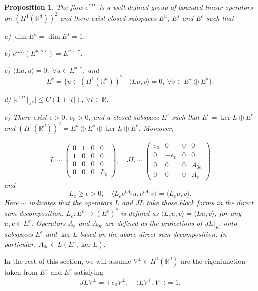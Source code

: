 \documentclass[12pt]{amsart}
\newcommand{\R}{\mathbb R}
\newtheorem{proposition}[theorem]{Proposition}
\begin{document}
\begin{proposition}\label{prop:linzeng}
The flow $e^{tJL}$ is a well-defined group of bounded linear operators on $(H^1(\R^d))^2$ and there exist closed subspaces $E^u,\ E^s$ and $E^c$ such that 

a) 
$\dim E^u=\dim E^s=1$.

b) $e^{tJL}(E^{u,s,c})=E^{u,s,c}$.

c) $ \langle Lu, u\rangle =0, \; \forall u\in E^{u,s},$ and $$E^c=\{u\in (H^1(\R^d))^2 \mid \langle Lu, v\rangle=0, \ \forall v\in E^u\oplus E^s\}.$$


d) $\bigl |e^{tJL}|_{E^c}\big|\le C(1+|t|)$, $\forall t\in \mathbb R $.

e) There exist $\epsilon >0$, $e_0>0$, and a closed subspace $E^e$ such that $E^c=\ker L\oplus E^e$ and $(H^1(\R^d))^2=E^u\oplus E^s\oplus \ker L \oplus E^e$. Moreover,  

$$L\sim 
\begin{pmatrix} 0 & 1 & 0 & 0\\
1&0&0&0\\
0&0&0&0\\
0&0&0&L_e
\end{pmatrix}, \quad 
JL\sim \begin{pmatrix}
e_0 &0&0&0\\
0&-e_0 &0&0\\
0&0&0&A_{0e}\\
0&0&0&A_e
\end{pmatrix}
$$
and 
$$
L_e\ge \epsilon>0, \quad \langle L_e e^{tA_e}u, e^{tA_e}v\rangle=\langle L_e u, v\rangle.
$$   
Here $\sim$ indicates that the operators $L$ and $JL$ take those block forms in the direct sum decomposition. $L_e: E^e\to (E^e)^*$ is defined as $\langle L_e u, v\rangle=\langle Lu, v\rangle$, for any $u, v\in E^e$. Operators $A_e$ and $A_{0e}$ are defined as the projections of $JL|_{E^c}$ onto subspaces $E^e$ and   $\ker L$ based on the above direct sum decomposition. In particular, $A_{0e} \in L(E^e, \ker L)$.      
\end{proposition}

In the rest of this section, we will assume $V^{\pm}\in H^1(\R^d)$ are the eigenfunction taken from $E^u$ and $E^s$ satisfying
\begin{align*}
JL V^{\pm}=\pm e_0 V^{\pm}, \quad \langle LV^+, V^-\rangle =1. 
\end{align*}
\end{document}

